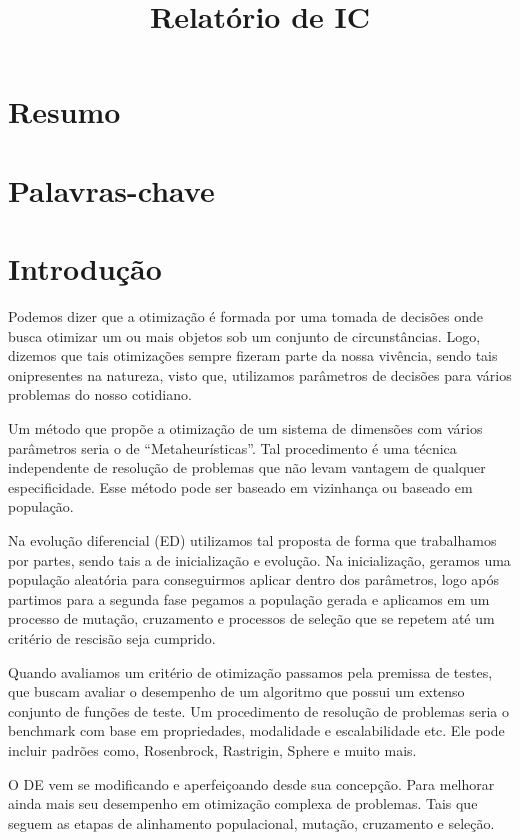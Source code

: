 \documentclass[a4paper, 12pt]{article}
\title{Relatório de IC}
\begin{document}
\maketitle

\section{Resumo}

\section{Palavras-chave}

\section{Introdução}
    Podemos dizer que a otimização é formada por uma tomada de decisões onde busca otimizar um ou mais objetos sob um conjunto de circunstâncias. Logo, dizemos que tais otimizações sempre fizeram parte da nossa vivência, sendo tais onipresentes na natureza, visto que, utilizamos parâmetros de decisões para vários problemas do nosso cotidiano.

    Um método que propõe a otimização de um sistema de dimensões com vários parâmetros seria o de “Metaheurísticas”. Tal procedimento é uma técnica independente de resolução de problemas que não levam vantagem de qualquer especificidade. Esse método pode ser baseado em vizinhança ou baseado em população.
    
    Na evolução diferencial (ED) utilizamos tal proposta de forma que trabalhamos por partes, sendo tais a de inicialização e evolução. Na inicialização, geramos uma população aleatória para conseguirmos aplicar dentro dos parâmetros, logo após partimos para a segunda fase pegamos a população gerada e aplicamos em um processo de mutação, cruzamento e processos de seleção que se repetem até um critério de rescisão seja cumprido.
    
    Quando avaliamos um critério de otimização passamos pela premissa de testes, que buscam avaliar o desempenho de um algoritmo que possui um extenso conjunto de funções de teste. Um procedimento de resolução de problemas seria o benchmark com base em propriedades, modalidade e escalabilidade etc. Ele pode incluir padrões como, Rosenbrock, Rastrigin, Sphere e muito mais. 
    
    O DE vem se modificando e aperfeiçoando desde sua concepção. Para melhorar ainda mais seu desempenho em otimização complexa de problemas. Tais que seguem as etapas de alinhamento populacional, mutação, cruzamento e seleção.
\end{document}
